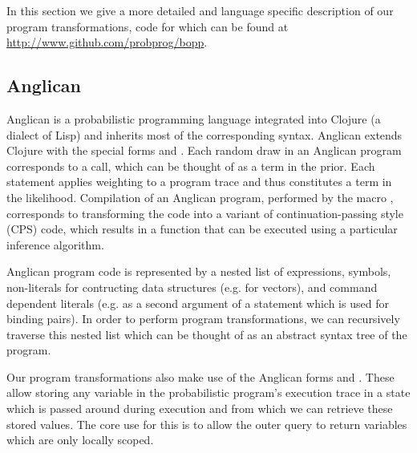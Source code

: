 
In this section we give a more detailed and language specific description of our program transformations, code for which can be found at \href{http://www.github.com/probprog/bopp}{\url{http://www.github.com/probprog/bopp}}. %

\subsection{Anglican}
Anglican is a probabilistic programming language integrated into Clojure (a dialect of Lisp) and inherits most of the corresponding syntax. Anglican extends Clojure with the special forms \sample and \observe \citep{tolpin2015probabilistic}.  
Each random draw in an Anglican program corresponds to a \sample  call, which can be thought of as a term in the prior. 
Each \observe statement applies weighting to a program trace and thus constitutes a term in the likelihood.
Compilation of an Anglican program, performed by the macro , corresponds to transforming the code into a variant of continuation-passing style (CPS) code, which results in a function that can be executed using a particular inference algorithm.

Anglican program code is represented by a nested list of expressions, symbols, non-literals for contructing data structures (e.g. \lsi{[...]} for vectors), and command dependent literals (e.g. \lsi{[...]} as a second argument of a  statement which is used for binding pairs).  In order to perform program transformations, we can recursively traverse this nested list which can be thought of as an abstract syntax tree of the program.

Our program transformations also make use of the Anglican forms  and .  These allow storing any variable in the probabilistic program's execution trace in a state which is passed around during execution and from which we can retrieve these stored values.  The core use for this is to allow the outer query to return variables which are only locally scoped.

